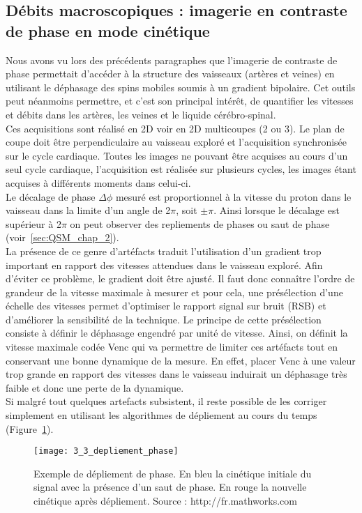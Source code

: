 \subsection{Débits macroscopiques : imagerie en contraste de phase en mode cinétique}
Nous avons vu lors des précédents paragraphes que l’imagerie de contraste de phase
permettait d’accéder à la structure des vaisseaux (artères et veines) en utilisant le déphasage des spins
mobiles soumis à un gradient bipolaire. Cet outils peut néanmoins permettre, et c’est son principal
intérêt, de quantifier les vitesses et débits dans les artères, les veines et le liquide cérébro-spinal.\\
Ces acquisitions sont réalisé en 2D voir en 2D multicoupes (2 ou 3). Le plan de coupe doit être
perpendiculaire au vaisseau exploré et l’acquisition synchronisée sur le cycle cardiaque. Toutes les
images ne pouvant être acquises au cours d’un seul cycle cardiaque, l’acquisition est réalisée sur
plusieurs cycles, les images étant acquises à différents moments dans celui-ci.\\
Le décalage de phase $\Delta \phi$ mesuré est proportionnel à la vitesse du proton dans le vaisseau dans
la limite d’un angle de 2$\pi$, soit $\pm \pi$. Ainsi lorsque le décalage est supérieur à 2$\pi$ on peut observer des
repliements de phases ou saut de phase (voir~\ref{sec:QSM_chap_2}).\\
La présence de ce genre d’artéfacts traduit l’utilisation d’un gradient trop important en rapport
des vitesses attendues dans le vaisseau exploré. Afin d’éviter ce problème, le gradient doit être ajusté.
Il faut donc connaître l’ordre de grandeur de la vitesse maximale à mesurer et pour cela, une
présélection d’une échelle des vitesses permet d’optimiser le rapport signal sur bruit (RSB) et
d’améliorer la sensibilité de la technique. Le principe de cette présélection consiste à définir le
déphasage engendré par unité de vitesse. Ainsi, on définit la vitesse maximale codée Venc qui va
permettre de limiter ces artéfacts tout en conservant une bonne dynamique de la mesure. En effet,
placer Venc à une valeur trop grande en rapport des vitesses dans le vaisseau induirait un déphasage
très faible et donc une perte de la dynamique.\\
Si malgré tout quelques artefacts subsistent, il reste possible de les corriger simplement en
utilisant les algorithmes de dépliement au cours du temps (Figure~\ref{fig:3_3_depliement_phase}).
\begin{figure}[!t]
\centering
\texttt{[image: 3\_3\_depliement\_phase]}
\caption{Exemple de dépliement de phase. En bleu la cinétique initiale du signal avec la présence d'un saut de
phase. En rouge la nouvelle cinétique après dépliement. Source : http://fr.mathworks.com}
\label{fig:3_3_depliement_phase}	
\end{figure}
